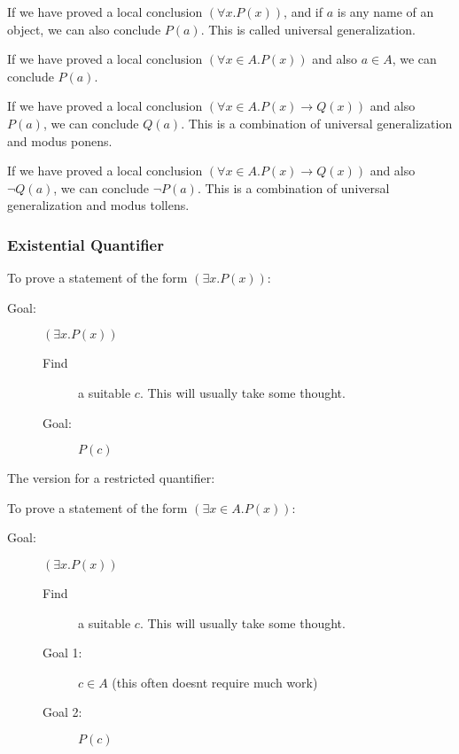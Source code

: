 \documentclass[12pt]{article}
\begin{document}
If we have proved a local conclusion $(\forall x.P(x))$, and if $a$ is
any name of an object, we can also conclude $P(a)$.  This is called
universal generalization.

If we have proved a local conclusion $(\forall x \in A.P(x))$ and
also $a \in A$, we can conclude $P(a)$.

If we have proved a local conclusion $(\forall x \in A.P(x)\rightarrow
Q(x))$ and also $P(a)$, we can conclude $Q(a)$.  This is a combination
of universal generalization and modus ponens.

If we have proved a local conclusion $(\forall x \in A.P(x)\rightarrow
Q(x))$ and also $\neg Q(a)$, we can conclude $\neg P(a)$.  This is a combination
of universal generalization and modus tollens.

\subsubsection{Existential Quantifier}

\noindent To prove a statement of the form $(\exists x.P(x))$:

\begin{description}

\item[Goal:]  $(\exists x.P(x))$
\begin{description}

\item[Find] a suitable $c$.  This will usually take some thought.

\item[Goal:]  $P(c)$

\end{description}

\end{description}

\noindent The version for a restricted quantifier:

\noindent To prove a statement of the form $(\exists x\in A.P(x))$:

\begin{description}

\item[Goal:]  $(\exists x.P(x))$
\begin{description}

\item[Find] a suitable $c$.  This will usually take some thought.

\item[Goal 1:]  $c \in A$ (this often doesnt require much work)

\item[Goal 2:]  $P(c)$

\end{description}

\end{description}
\end{document}
